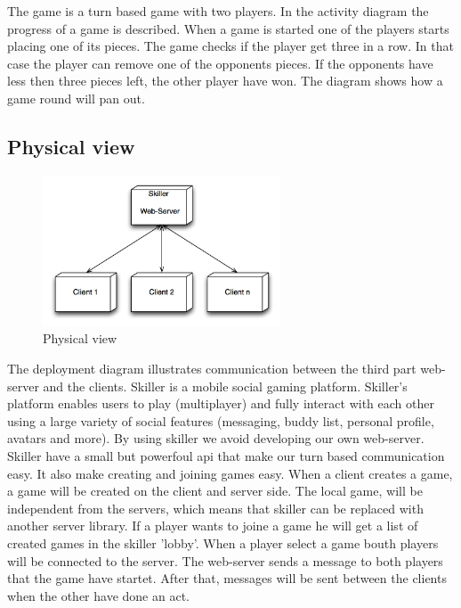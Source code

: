 The game is a turn based game with two players. In the activity diagram the progress of a game is described. When a game is started one of the players starts placing one of its pieces. The game checks if the player get three in a row. In that case the player can remove one of the opponents pieces. If the opponents have less then three pieces left, the other player have won. The diagram shows how a game round will pan out. 

\subsection{Physical view}

\begin{figure}[H]
\begin{center}
\includegraphics[width=200pt]{./Images/physicalLayer1}
\end{center}
\caption{Physical view}
\end{figure}

The deployment diagram illustrates communication between the third part web-server and the clients. Skiller is a mobile social gaming platform. Skiller’s platform enables users to play (multiplayer) and fully interact with each other using a large variety of social features (messaging, buddy list, personal profile, avatars and more). By using skiller we avoid developing our own web-server. Skiller have a small but powerfoul api that make our turn based communication easy. It also make creating and joining games easy. When a client creates a game, a game will be created on the client and server side. The local game, will be independent from the servers, which means that skiller can be replaced with another server library. If a player wants to joine a game he will get a list of created games in the skiller 'lobby'. When a player select a game bouth players will be connected to the server. The web-server sends a message to both players that the game have startet. After that, messages will be sent between the clients when the other have done an act.




